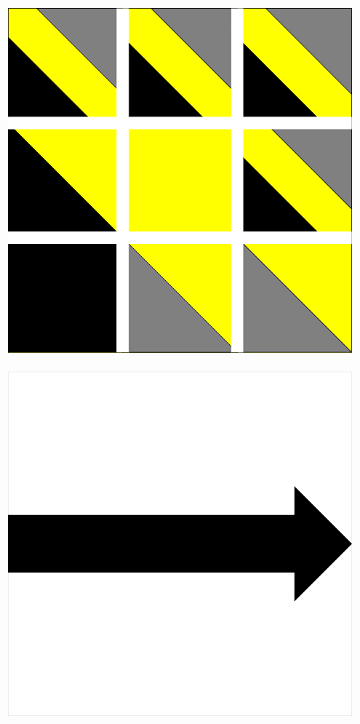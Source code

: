 \documentclass[a4paper]{article}
\begin{document}
\begin{figure}[!h]
    \centering
    \begin{subfigure}[t]{0.17\textwidth}
        \includegraphics[width=\textwidth]{img/rule40.png}
    \end{subfigure}
    \hfill
    \begin{subfigure}[t]{0.17\textwidth} 
        \includegraphics[width=\textwidth]{img/fleche3.png} 

\end{subfigure}
\end{figure}
\end{document}
